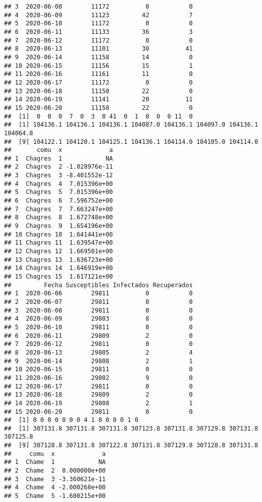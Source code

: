 \documentclass[
]{article}
\begin{document}
\begin{verbatim}
## 3  2020-06-08        11172          0           0
## 4  2020-06-09        11123         42           7
## 5  2020-06-10        11172          0           0
## 6  2020-06-11        11133         36           3
## 7  2020-06-12        11172          0           0
## 8  2020-06-13        11101         30          41
## 9  2020-06-14        11158         14           0
## 10 2020-06-15        11156         15           1
## 11 2020-06-16        11161         11           0
## 12 2020-06-17        11172          0           0
## 13 2020-06-18        11150         22           0
## 14 2020-06-19        11141         20          11
## 15 2020-06-20        11150         22           0
##  [1]  0  0  0  7  0  3  0 41  0  1  0  0  0 11  0
##  [1] 104136.1 104136.1 104136.1 104087.0 104136.1 104097.0 104136.1 104064.8
##  [9] 104122.1 104120.1 104125.1 104136.1 104114.0 104105.0 104114.0
##       comu  x             a
## 1  Chagres  1            NA
## 2  Chagres  2 -1.028976e-11
## 3  Chagres  3 -8.401552e-12
## 4  Chagres  4  7.015396e+00
## 5  Chagres  5  7.015396e+00
## 6  Chagres  6  7.596752e+00
## 7  Chagres  7  7.663247e+00
## 8  Chagres  8  1.672748e+00
## 9  Chagres  9  1.654196e+00
## 10 Chagres 10  1.641441e+00
## 11 Chagres 11  1.639547e+00
## 12 Chagres 12  1.669501e+00
## 13 Chagres 13  1.636723e+00
## 14 Chagres 14  1.646919e+00
## 15 Chagres 15  1.617121e+00
##         Fecha Susceptibles Infectados Recuperados
## 1  2020-06-06        29811          0           0
## 2  2020-06-07        29811          0           0
## 3  2020-06-08        29811          0           0
## 4  2020-06-09        29803          8           0
## 5  2020-06-10        29811          0           0
## 6  2020-06-11        29809          2           0
## 7  2020-06-12        29811          0           0
## 8  2020-06-13        29805          2           4
## 9  2020-06-14        29808          2           1
## 10 2020-06-15        29811          0           0
## 11 2020-06-16        29802          9           0
## 12 2020-06-17        29811          0           0
## 13 2020-06-18        29809          2           0
## 14 2020-06-19        29808          2           1
## 15 2020-06-20        29811          0           0
##  [1] 0 0 0 0 0 0 0 4 1 0 0 0 0 1 0
##  [1] 307131.8 307131.8 307131.8 307123.8 307131.8 307129.8 307131.8 307125.8
##  [9] 307128.8 307131.8 307122.8 307131.8 307129.8 307128.8 307131.8
##     comu  x             a
## 1  Chame  1            NA
## 2  Chame  2  0.000000e+00
## 3  Chame  3 -3.360621e-11
## 4  Chame  4 -2.000268e+00
## 5  Chame  5 -1.600215e+00

\end{verbatim}
\end{document}
